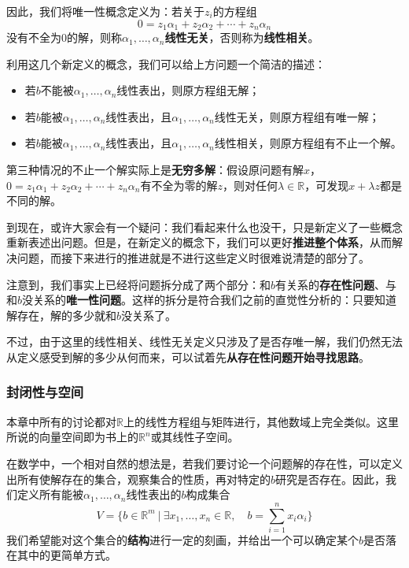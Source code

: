 \documentclass[a4paper,UTF8,fontset=windows]{ctexart}
\newcommand*{\note}{\noindent *}
\begin{document}
因此，我们将唯一性概念定义为：若关于$z_i$的方程组
$$0=z_1\alpha_1+z_2\alpha_2+\cdots+z_n\alpha_n$$
没有不全为0的解，则称$\alpha_1,\dots,\alpha_n$\textbf{线性无关}，否则称为\textbf{线性相关}。

利用这几个新定义的概念，我们可以给上方问题一个简洁的描述：
\begin{itemize}
    \item 若$b$不能被$\alpha_1,\dots,\alpha_n$线性表出，则原方程组无解；
    \item 若$b$能被$\alpha_1,\dots,\alpha_n$线性表出，且$\alpha_1,\dots,\alpha_n$线性无关，则原方程组有唯一解；
    \item 若$b$能被$\alpha_1,\dots,\alpha_n$线性表出，且$\alpha_1,\dots,\alpha_n$线性相关，则原方程组有不止一个解。
\end{itemize}

\note 第三种情况的不止一个解实际上是\textbf{无穷多解}：假设原问题有解$x$，$0=z_1\alpha_1+z_2\alpha_2+\cdots+z_n\alpha_n$有不全为零的解$z$，则对任何$\lambda\in\mathbb{R}$，可发现$x+\lambda z$都是不同的解。

\note 到现在，或许大家会有一个疑问：我们看起来什么也没干，只是新定义了一些概念重新表述出问题。但是，在新定义的概念下，我们可以更好\textbf{推进整个体系}，从而解决问题，而接下来进行的推进就是不进行这些定义时很难说清楚的部分了。

注意到，我们事实上已经将问题拆分成了两个部分：和$b$有关系的\textbf{存在性问题}、与和$b$没关系的\textbf{唯一性问题}。这样的拆分是符合我们之前的直觉性分析的：只要知道解存在，解的多少就和$b$没关系了。

不过，由于这里的线性相关、线性无关定义只涉及了是否存唯一解，我们仍然无法从定义感受到解的多少从何而来，可以试着先\textbf{从存在性问题开始寻找思路}。

\subsubsection{封闭性与空间}
\note 本章中所有的讨论都对$\mathbb{R}$上的线性方程组与矩阵进行，其他数域上完全类似。这里所说的向量空间即为书上的$\mathbb{R}^n$或其线性子空间。

在数学中，一个相对自然的想法是，若我们要讨论一个问题解的存在性，可以定义出所有使解存在的集合，观察集合的性质，再对特定的$b$研究是否存在。因此，我们定义所有能被$\alpha_1,\dots,\alpha_n$线性表出的$b$构成集合
$$V=\bigg\{b\in\mathbb{R}^m\ \bigg|\ \exists x_1,\dots,x_n\in\mathbb{R},\quad b=\sum_{i=1}^nx_i\alpha_i\bigg\}$$
我们希望能对这个集合的\textbf{结构}进行一定的刻画，并给出一个可以确定某个$b$是否落在其中的更简单方式。
\end{document}
